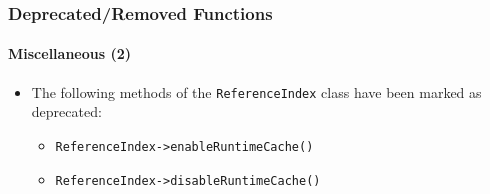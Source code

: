 %

\begin{frame}[fragile]
	\frametitle{Deprecated/Removed Functions}
	\framesubtitle{Miscellaneous (2)}

	\begin{itemize}
		\item The following methods of the \texttt{ReferenceIndex} class have been marked as deprecated:
			\begin{itemize}\smaller
				\item \texttt{ReferenceIndex->enableRuntimeCache()}
				\item \texttt{ReferenceIndex->disableRuntimeCache()}
			\end{itemize}\normalsize

	\end{itemize}

\end{frame}

